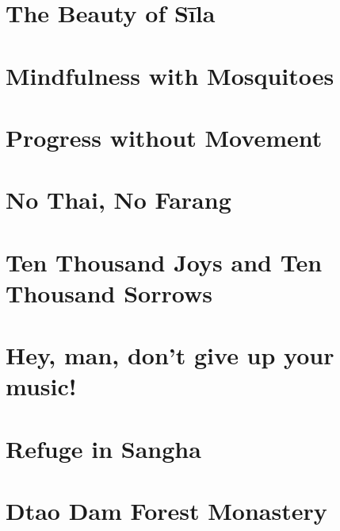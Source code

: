 \documentclass[11pt,twoside,final]{memoir}
\begin{document}
\chapter{The Beauty of Sīla}


\chapter{Mindfulness with Mosquitoes}


\chapter{Progress without Movement}


\chapter{No Thai, No Farang}


\chapter{Ten Thousand Joys and Ten Thousand Sorrows}


\chapter{Hey, man, don't give up your music!}


\chapter{Refuge in Sangha}


\chapter{Dtao Dam Forest Monastery}

\end{document}
